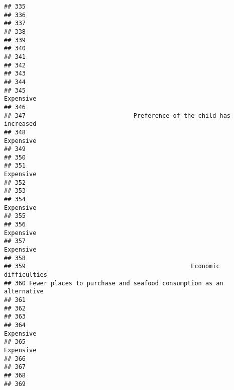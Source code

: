 \documentclass[
]{article}
\begin{document}
\begin{verbatim}
## 335                                                                    
## 336                                                                    
## 337                                                                    
## 338                                                                    
## 339                                                                    
## 340                                                                    
## 341                                                                    
## 342                                                                    
## 343                                                                    
## 344                                                                    
## 345                                                          Expensive 
## 346                                                                    
## 347                              Preference of the child has increased 
## 348                                                          Expensive 
## 349                                                                    
## 350                                                                    
## 351                                                          Expensive 
## 352                                                                    
## 353                                                                    
## 354                                                          Expensive 
## 355                                                                    
## 356                                                          Expensive 
## 357                                                          Expensive 
## 358                                                                    
## 359                                              Economic difficulties 
## 360 Fewer places to purchase and seafood consumption as an alternative 
## 361                                                                    
## 362                                                                    
## 363                                                                    
## 364                                                          Expensive 
## 365                                                          Expensive 
## 366                                                                    
## 367                                                                    
## 368                                                                    
## 369                                                                    

\end{verbatim}
\end{document}
